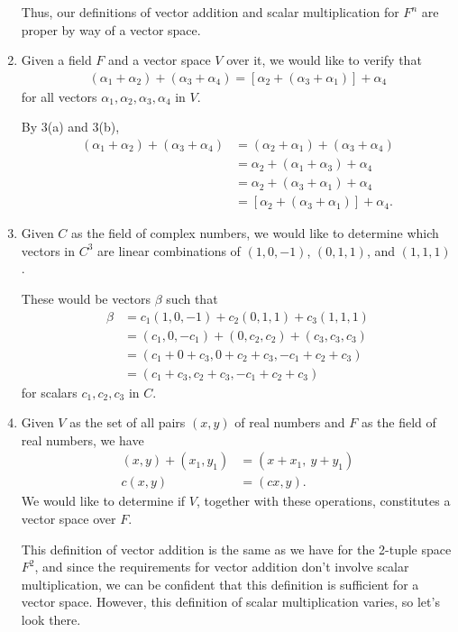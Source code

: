 \documentclass[12pt]{article}
\begin{document}
\begin{enumerate}
    Thus, our definitions of vector addition and scalar multiplication for $F^{n}$
    are proper by way of a vector space.

  \item
    Given a field $F$ and a vector space $V$ over it, we would like to verify that
    \begin{align*}
      (\alpha_1 + \alpha_2) + (\alpha_3 + \alpha_4) =
      [\alpha_2 + (\alpha_3 + \alpha_1)] + \alpha_4
    \end{align*}
    for all vectors $\alpha_1,\alpha_2,\alpha_3,\alpha_4$ in $V$.

    By 3(a) and 3(b),
    \begin{align*}
      (\alpha_1 + \alpha_2) + (\alpha_3 + \alpha_4) &=
      (\alpha_2 + \alpha_1) + (\alpha_3 + \alpha_4)\\
      &= \alpha_2 + (\alpha_1 + \alpha_3) + \alpha_4\\
      &= \alpha_2 + (\alpha_3 + \alpha_1) + \alpha_4\\
      &= [\alpha_2 + (\alpha_3 + \alpha_1)] + \alpha_4.
    \end{align*}

  \item
    Given $C$ as the field of complex numbers, we would like to determine which
    vectors in $C^3$ are linear combinations of $(1,0,-1)$, $(0,1,1)$, and $(1,1,1)$.

    These would be vectors $\beta$ such that
    \begin{align*}
      \beta &= c_1(1,0,-1) + c_2(0,1,1) + c_3(1,1,1)\\
            &= (c_1,0,-c_1) + (0,c_2,c_2) + (c_3,c_3,c_3)\\
            &= (c_1+0+c_3,0+c_2+c_3,-c_1+c_2+c_3)\\
            &= (c_1+c_3,c_2+c_3,-c_1+c_2+c_3)
    \end{align*}
    for scalars $c_1,c_2,c_3$ in $C$.

  \item
    Given $V$ as the set of all pairs $(x,y)$ of real numbers and $F$ as the field of
    real numbers, we have
    \begin{align*}
      (x,y) + (x_1,y_1) &= (x + x_1,\ y + y_1)\\
      c(x,y) &= (cx,y).
    \end{align*}
    We would like to determine if $V$, together with these operations, constitutes a
    vector space over $F$.

    This definition of vector addition is the same as we have for the 2-tuple space
    $F^{2}$, and since the requirements for vector addition don't involve scalar
    multiplication, we can be confident that this definition is sufficient for a
    vector space. However, this definition of scalar multiplication varies, so let's
    look there.


\end{enumerate}
\end{document}
